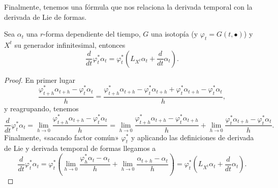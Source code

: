   Finalmente, tenemos una fórmula que nos relaciona la derivada temporal con la derivada de Lie de formas.
  \begin{prop}
    Sea $\alpha_t$ una $r$-forma dependiente del tiempo, $G$ una isotopía (y $\varphi_t=G(t,\bullet)$) y $X^t$ su generador infinitesimal, entonces
    \begin{equation*}
      \frac{d}{dt}\varphi^*_t \alpha_t = \varphi^*_t \left( L_{X^t}\alpha_t + \frac{d}{dt}\alpha_t \right).
    \end{equation*}
  \end{prop}

  \begin{proof}
    En primer lugar
    \begin{equation*}
      \frac{\varphi^*_{t+h}\alpha_{t+h}-\varphi^*_t\alpha_t}{h}= \frac{\varphi^*_{t+h}\alpha_{t+h}-\varphi^*_t\alpha_{t+h}+\varphi^*_t\alpha_{t+h}-\varphi^*_t\alpha_t}{h},
    \end{equation*}
    y reagrupando, tenemos
    \begin{equation*}
      \frac{d}{dt}\varphi^*_t \alpha_t=\lim_{h\rightarrow 0}\frac{\varphi^*_{t+h}\alpha_{t+h}-\varphi^*_t\alpha_{t}}{h}=\lim_{h\rightarrow 0}\frac{\varphi^*_{t+h}\alpha_{t+h}-\varphi^*_t\alpha_{t+h}}{h}+\lim_{h\rightarrow 0}\frac{\varphi^*_t\alpha_{t+h}-\varphi^*_t\alpha_t}{h}.
    \end{equation*}
    Finalmente, «sacando factor común» $\varphi^*_t$ y aplicando las definiciones de derivada de Lie y derivada temporal de formas llegamos a
    \begin{equation*}
      \frac{d}{dt}\varphi^*_t \alpha_t=\varphi^*_t \left( \lim_{h\rightarrow 0}\frac{\varphi^*_{h}\alpha_{t}-\alpha_{t}}{h}+\lim_{h\rightarrow 0}\frac{\alpha_{t+h}-\alpha_t}{h}\right)=\varphi^*_t\left(L_{X^t}\alpha_t + \frac{d}{dt}\alpha_t\right).
    \end{equation*}
  \end{proof}

